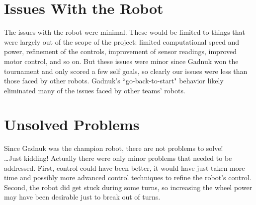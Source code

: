 \documentclass{article}
\begin{document}
\section{Issues With the Robot}
The issues with the robot were minimal. These would be limited to things that were largely out of the scope of the project: limited computational speed and power, refinement of the controls, improvement of sensor readings, improved motor control, and so on. But these issues were minor since Gadnuk won the tournament and only scored a few self goals, so clearly our issues were less than those faced by other robots. Gadnuk's ``go-back-to-start" behavior likely eliminated many of the issues faced by other teams' robots.


\section{Unsolved Problems}
Since Gadnuk was the champion robot, there are not problems to solve!\\

\dots Just kidding! Actually there were only minor problems that needed to be addressed. First, control could have been better, it would have just taken more time and possibly more advanced control techniques to refine the robot's control. Second, the robot did get stuck during some turns, so increasing the wheel power may have been desirable just to break out of turns.
\end{document}
